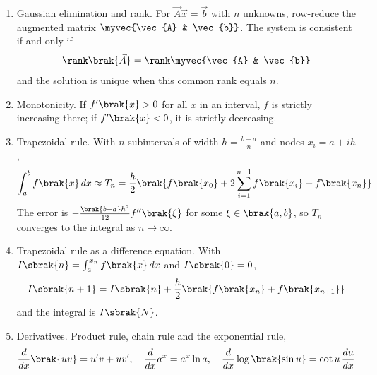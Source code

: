 \begin{enumerate}[label=\thesubsection.\arabic*, ref=\thesubsection.\theenumi]
\begin{align}
\end{align}
\item Gaussian elimination and rank. For $\vec{A}\vec{x} = \vec{b}$ with $n$ unknowns, row-reduce the augmented matrix $\myvec{\vec{A} & \vec{b}}$. The system is consistent if and only if
\begin{align}
	\rank\brak{\vec{A}} = \rank\myvec{\vec{A} & \vec{b}} \label{eq:CBSE12-rank}
\end{align}
and the solution is unique when this common rank equals $n$.
\item Monotonicity. If $f^{\prime}\brak{x} > 0$ for all $x$ in an interval, $f$ is strictly increasing there; if $f^{\prime}\brak{x} < 0$, it is strictly decreasing. 
\item Trapezoidal rule. With $n$ subintervals of width $h = \frac{b-a}{n}$ and nodes $x_i = a + ih$,
\begin{align}
	\int_a^b f\brak{x}\,dx \approx T_n = \frac{h}{2}\brak{f\brak{x_0} + 2\sum_{i=1}^{n-1}f\brak{x_i} + f\brak{x_n}} \label{eq:CBSE12-trap}
\end{align}
The error is $-\frac{\brak{b-a}h^2}{12}f^{\prime\prime}\brak{\xi}$ for some $\xi \in \brak{a,b}$, so $T_n$ converges to the integral as $n \to \infty$.
\item Trapezoidal rule as a difference equation. With $I\sbrak{n} = \int_a^{x_n} f\brak{x}\,dx$ and $I\sbrak{0} = 0$,
\begin{align}
	I\sbrak{n+1} = I\sbrak{n} + \frac{h}{2}\brak{f\brak{x_n} + f\brak{x_{n+1}}} \label{eq:CBSE12-trapdiff}
\end{align}
and the integral is $I\sbrak{N}$.
\item Derivatives. Product rule, chain rule and the exponential rule,
\begin{align}
	\frac{d}{dx}\brak{uv} = u^{\prime}v + uv^{\prime}, \quad
	\frac{d}{dx}a^x = a^x\ln a, \quad
	\frac{d}{dx}\log\brak{\sin u} = \cot u\,\frac{du}{dx} \label{eq:CBSE12-deriv}
\end{align}


\end{enumerate}
